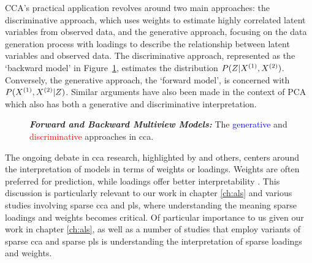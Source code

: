 CCA's practical application revolves around two main approaches: the discriminative approach, which uses weights to estimate highly correlated latent variables from observed data, and the generative approach, focusing on the data generation process with loadings to describe the relationship between latent variables and observed data. The discriminative approach, represented as the `backward model' in Figure~\ref{fig:forward-backward-models}, estimates the distribution $P(Z|X^{(1)},X^{(2)})$. Conversely, the generative approach, the `forward model', is concerned with $P(X^{(1)},X^{(2)}|Z)$. Similar arguments have also been made in the context of PCA \citep{park2023critical} which also has both a generative \citep{tipping1999probabilistic} and discriminative\citep{hotelling1933analysis} interpretation.

\begin{figure}
    \centering
    \caption[Forward and Backward Multiview Models]{\textit{\textbf{Forward and Backward Multiview Models:}} The \textcolor{blue}{generative} and \textcolor{red}{discriminative} approaches in \acrshort{cca}.}\label{fig:forward-backward-models}
\end{figure}

The ongoing debate in \acrshort{cca} research, highlighted by \citet{gu2018simultaneous} and others, centers around the interpretation of models in terms of weights or loadings.
Weights are often preferred for prediction, while loadings offer better interpretability \citep{liu2022improved}.
This discussion is particularly relevant to our work in chapter \ref{ch:als} and various studies involving sparse \acrshort{cca} and \acrshort{pls}, where understanding the meaning sparse loadings and weights becomes critical.
Of particular importance to us given our work in chapter \ref{ch:als}, as well as a number of studies that employ variants of sparse \acrshort{cca} and sparse \acrshort{pls} is understanding the interpretation of sparse loadings and weights.

